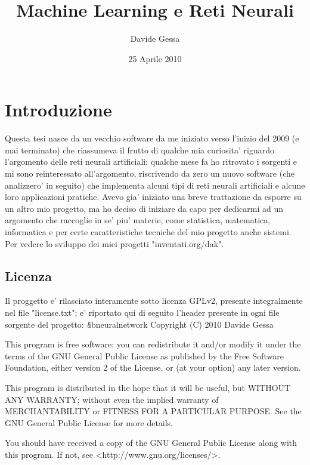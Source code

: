 \documentclass[a4paper,10pt]{book}
\title{Machine Learning e Reti Neurali}
\author{Davide Gessa}
\date{25 Aprile 2010}
\begin{document}
\maketitle

\tableofcontents
\setcounter{tocdepth}{4}
\listoffigures
\listoftables


\chapter{Introduzione}
Questa tesi nasce da un vecchio software da me iniziato verso l'inizio del 2009 (e
mai terminato) che riassumeva il frutto di qualche mia curiosita' riguardo 
l'argomento delle reti neurali artificiali; qualche mese fa ho ritrovato i sorgenti 
e mi sono 
reinteressato all'argomento, riscrivendo da zero un nuovo software (che analizzero' 
in seguito) che implementa alcuni tipi di reti neurali artificiali e alcune
loro applicazioni
pratiche. Avevo gia' iniziato una breve trattazione da esporre su un altro mio
progetto, ma ho deciso di iniziare da capo per dedicarmi ad un argomento che
raccoglie in se' piu' materie, come statistica, matematica, informatica e per certe
caratteristiche tecniche del mio progetto anche sistemi.
Per vedere lo sviluppo dei miei progetti "inventati.org/dak".

\section{Licenza}
Il proggetto e' rilasciato interamente sotto licenza GPLv2, presente integralmente
nel file "license.txt"; e' riportato qui di 
seguito l'header presente in ogni file sorgente del progetto:
\newline
\newline 
\ttfamily
\textit
    libneuralnetwork
    Copyright (C) 2010 Davide Gessa
    
    This program is free software: you can redistribute it and/or modify
    it under the terms of the GNU General Public License as published by
    the Free Software Foundation, either version 2 of the License, or
    (at your option) any later version.

    This program is distributed in the hope that it will be useful,
    but WITHOUT ANY WARRANTY; without even the implied warranty of
    MERCHANTABILITY or FITNESS FOR A PARTICULAR PURPOSE.  See the
    GNU General Public License for more details.

    You should have received a copy of the GNU General Public License
    along with this program.  If not, see <http://www.gnu.org/licenses/>.
\rmfamily
\newline
\end{document}

